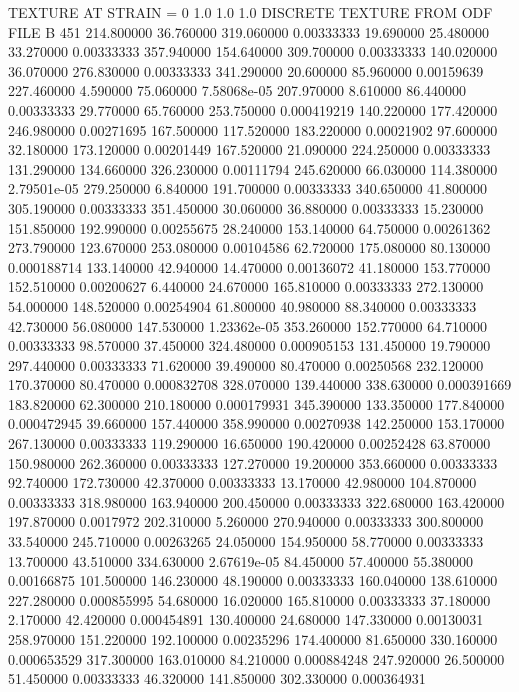 TEXTURE AT STRAIN = 0
   1.0   1.0   1.0
DISCRETE TEXTURE FROM ODF FILE 
B    451
214.800000	36.760000	319.060000	0.00333333
19.690000	25.480000	33.270000	0.00333333
357.940000	154.640000	309.700000	0.00333333
140.020000	36.070000	276.830000	0.00333333
341.290000	20.600000	85.960000	0.00159639
227.460000	4.590000	75.060000	7.58068e-05
207.970000	8.610000	86.440000	0.00333333
29.770000	65.760000	253.750000	0.000419219
140.220000	177.420000	246.980000	0.00271695
167.500000	117.520000	183.220000	0.00021902
97.600000	32.180000	173.120000	0.00201449
167.520000	21.090000	224.250000	0.00333333
131.290000	134.660000	326.230000	0.00111794
245.620000	66.030000	114.380000	2.79501e-05
279.250000	6.840000	191.700000	0.00333333
340.650000	41.800000	305.190000	0.00333333
351.450000	30.060000	36.880000	0.00333333
15.230000	151.850000	192.990000	0.00255675
28.240000	153.140000	64.750000	0.00261362
273.790000	123.670000	253.080000	0.00104586
62.720000	175.080000	80.130000	0.000188714
133.140000	42.940000	14.470000	0.00136072
41.180000	153.770000	152.510000	0.00200627
6.440000	24.670000	165.810000	0.00333333
272.130000	54.000000	148.520000	0.00254904
61.800000	40.980000	88.340000	0.00333333
42.730000	56.080000	147.530000	1.23362e-05
353.260000	152.770000	64.710000	0.00333333
98.570000	37.450000	324.480000	0.000905153
131.450000	19.790000	297.440000	0.00333333
71.620000	39.490000	80.470000	0.00250568
232.120000	170.370000	80.470000	0.000832708
328.070000	139.440000	338.630000	0.000391669
183.820000	62.300000	210.180000	0.000179931
345.390000	133.350000	177.840000	0.000472945
39.660000	157.440000	358.990000	0.00270938
142.250000	153.170000	267.130000	0.00333333
119.290000	16.650000	190.420000	0.00252428
63.870000	150.980000	262.360000	0.00333333
127.270000	19.200000	353.660000	0.00333333
92.740000	172.730000	42.370000	0.00333333
13.170000	42.980000	104.870000	0.00333333
318.980000	163.940000	200.450000	0.00333333
322.680000	163.420000	197.870000	0.0017972
202.310000	5.260000	270.940000	0.00333333
300.800000	33.540000	245.710000	0.00263265
24.050000	154.950000	58.770000	0.00333333
13.700000	43.510000	334.630000	2.67619e-05
84.450000	57.400000	55.380000	0.00166875
101.500000	146.230000	48.190000	0.00333333
160.040000	138.610000	227.280000	0.000855995
54.680000	16.020000	165.810000	0.00333333
37.180000	2.170000	42.420000	0.000454891
130.400000	24.680000	147.330000	0.00130031
258.970000	151.220000	192.100000	0.00235296
174.400000	81.650000	330.160000	0.000653529
317.300000	163.010000	84.210000	0.000884248
247.920000	26.500000	51.450000	0.00333333
46.320000	141.850000	302.330000	0.000364931
